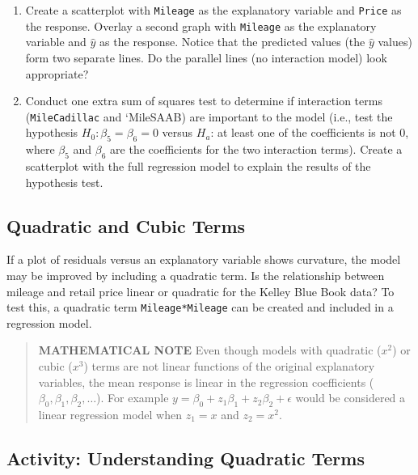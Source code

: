 \documentclass[
]{book}
\begin{document}
\begin{enumerate}
\def\labelenumi{\alph{enumi}.}
\item
  Create a scatterplot with \texttt{Mileage} as the explanatory variable and \texttt{Price} as the response. Overlay a second graph with \texttt{Mileage} as the explanatory variable and \(\hat y\) as the response. Notice that the predicted values (the \(\hat y\) values) form two separate lines. Do the parallel lines (no interaction model) look appropriate?
\item
  Conduct one extra sum of squares test to determine if interaction terms (\texttt{MileCadillac} and `MileSAAB) are important to the model (i.e., test the hypothesis \(H_0: \beta_5 = \beta_6 = 0\) versus \(H_a\): at least one of the coefficients is not 0, where \(\beta_5\) and \(\beta_6\) are the coefficients for the two interaction terms). Create a scatterplot with the full regression model to explain the results of the hypothesis test.
\end{enumerate}

\hypertarget{quadratic-and-cubic-terms}{%
\subsection*{Quadratic and Cubic Terms}\label{quadratic-and-cubic-terms}}

If a plot of residuals versus an explanatory variable shows curvature, the model may be improved by including a quadratic term. Is the relationship between mileage and retail price linear or quadratic for the Kelley Blue Book data? To test this, a quadratic term \texttt{Mileage*Mileage} can be created and included in a regression model.

\begin{quote}
\textbf{MATHEMATICAL NOTE} Even though models with quadratic (\(x^2\)) or cubic (\(x^3\)) terms are not linear functions of the original explanatory variables, the mean response is linear in the regression coefficients (\(\beta_0, \beta_1, \beta_2, \dots\)). For example \(y = \beta_0 + z_1 \beta_1 + z_2 \beta_2 + \epsilon\) would be considered a linear regression model when \(z_1 = x\) and \(z_2 = x^2\).
\end{quote}

\hypertarget{activity-understanding-quadratic-terms}{%
\subsection*{Activity: Understanding Quadratic Terms}\label{activity-understanding-quadratic-terms}}
\end{document}
